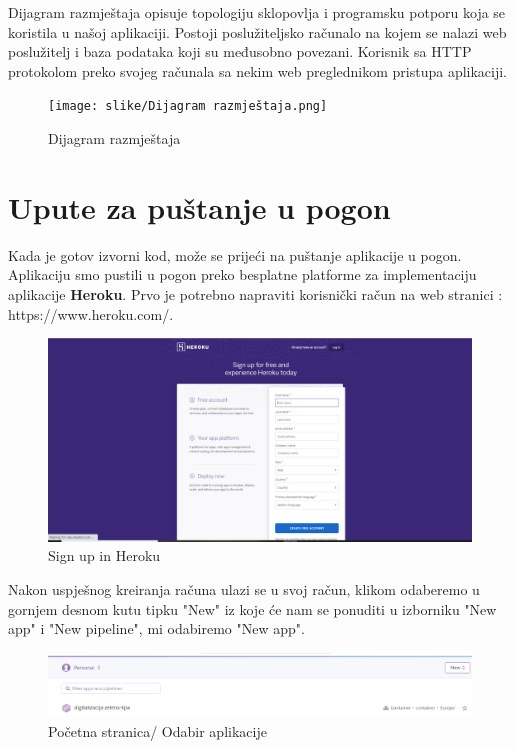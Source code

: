 			 Dijagram razmještaja opisuje topologiju sklopovlja i programsku potporu koja se koristila u našoj aplikaciji. Postoji poslužiteljsko računalo na kojem se nalazi web poslužitelj i baza podataka koji su međusobno povezani. Korisnik sa HTTP protokolom preko svojeg računala sa nekim web preglednikom pristupa aplikaciji.
			 
			\begin{figure}[H]
				\texttt{[image: slike/Dijagram razmještaja.png]} %
				\centering
				\caption{Dijagram razmještaja}
				\label{DRAZ}
			\end{figure}
			\eject 
		
		\section{Upute za puštanje u pogon}
		
				
			 \text Kada je gotov izvorni kod, može se prijeći na puštanje aplikacije u pogon. Aplikaciju smo pustili u pogon preko besplatne platforme za implementaciju aplikacije \textbf{Heroku}. Prvo je potrebno napraviti korisnički račun na web stranici : https://www.heroku.com/. 
			 \begin{figure}[H]
			 	\includegraphics[scale=0.4]{slike/heroku sign up.png} 
			 	\centering
			 	\caption{Sign up in Heroku}
			 	\label{SUH}
			 \end{figure}
			 
			 Nakon uspješnog kreiranja računa ulazi se u svoj račun, klikom odaberemo u gornjem desnom kutu tipku "New" iz koje će nam se ponuditi u izborniku "New app" i "New pipeline", mi odabiremo "New app".
			 
			 \begin{figure}[H]
			 	\includegraphics[scale=0.5]{slike/odabir aplikacije.png} 
			 	\centering
			 	\caption{Početna stranica/ Odabir aplikacije}
			 	\label{HP}
			 \end{figure}
			 

